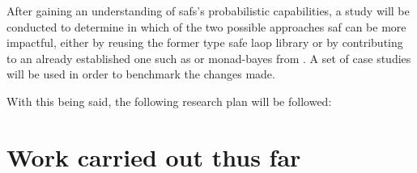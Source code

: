 \documentclass[
  oneside,
  11pt, a4paper,
  footinclude=true,
  headinclude=true,
  cleardoublepage=empty
]{scrbook}
\theoremstyle{definition}
\theoremstyle{definition}
\begin{document}
    After gaining an understanding of \glspl{saf}'s probabilistic capabilities, a study will be conducted to determine in which of the two possible approaches \gls{saf} can be more impactful, either by reusing the former type safe \gls{laop} library or by contributing to an already established one such as \cite{erwig_kollmansberger_2006} or monad-bayes from \cite{scibior2018functional}. A set of case studies will be used in order to benchmark the changes made.
	
	With this being said, the following research plan will be followed:
	
    \begin{table}[h]
    \centering
    \end{table}
    
    \section{Work carried out thus far}\label{sec-current-work}
	
\end{document}
